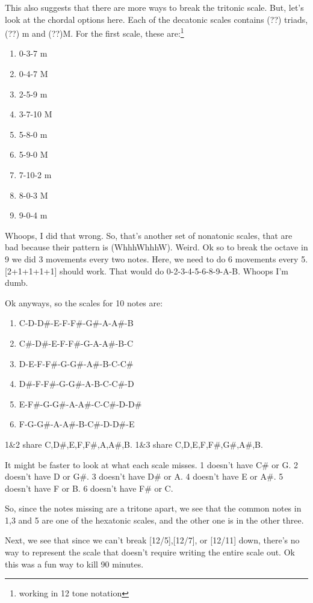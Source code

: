\documentclass[12pt]{article}[titlepage]
\newcommand{\1}{\={a}}
\newcommand{\2}{\={e}}
\newcommand{\3}{\={\i}}
\newcommand{\4}{\=o}
\newcommand{\5}{\=u}
\newcommand{\6}{\={A}}
\renewcommand{\,}{\textsuperscript{,}}
\begin{document}
This also suggests that there are more ways to break the tritonic scale.
But, let's look at the chordal options here.
Each of the decatonic scales contains (??) triads, (??) m and (??)M.
For the first scale, these are:\footnote{working in 12 tone notation}
\begin{enumerate}
\item 0-3-7 m
\item 0-4-7 M
\item 2-5-9 m
\item 3-7-10 M
\item 5-8-0 m
\item 5-9-0 M
\item 7-10-2 m
\item 8-0-3 M
\item 9-0-4 m
\end{enumerate}

Whoops, I did that wrong.
So, that's another set of nonatonic scales, that are bad because their pattern is  (WhhhWhhhW).
Weird.
Ok so to break the octave in 9 we did 3 movements every two notes.
Here, we need to do 6 movements every 5.
[2+1+1+1+1] should work.
That would do 0-2-3-4-5-6-8-9-A-B.
Whoops I'm dumb.

Ok anyways, so the scales for 10 notes are:
\begin{enumerate}
\item C-D-D\#-E-F-F\#-G\#-A-A\#-B
\item C\#-D\#-E-F-F\#-G-A-A\#-B-C
\item D-E-F-F\#-G-G\#-A\#-B-C-C\#
\item D\#-F-F\#-G-G\#-A-B-C-C\#-D
\item E-F\#-G-G\#-A-A\#-C-C\#-D-D\#
\item F-G-G\#-A-A\#-B-C\#-D-D\#-E
\end{enumerate}

1\&2 share C,D\#,E,F,F\#,A,A\#,B.
1\&3 share C,D,E,F,F\#,G\#,A\#,B.

It might be faster to look at what each scale misses.
1 doesn't have C\# or G.
2 doesn't have D or G\#.
3 doesn't have D\# or A.
4 doesn't have E or A\#.
5 doesn't have F or B.
6 doesn't have F\# or C.

So, since the notes missing are a tritone apart, we see that the common notes in 1,3 and 5 are one of the hexatonic scales, and the other one is in the other three.

Next, we see that since we can't break [12/5],[12/7], or [12/11] down, there's no way to represent the scale that doesn't require writing the entire scale out.
Ok this was a fun way to kill 90 minutes.
\end{document}
